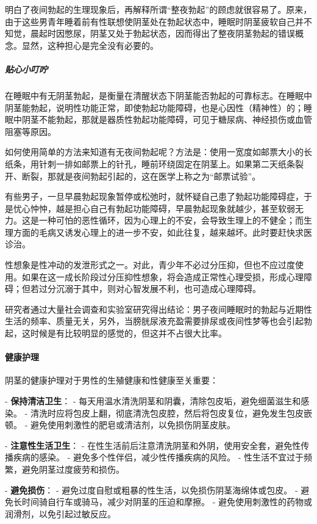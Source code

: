 明白了夜间勃起的生理现象后，再解释所谓“整夜勃起”的顾虑就很容易了。原来，由于这些男青年睡着前有性联想使阴茎处在勃起状态中，睡眠时阴茎疲软自己并不知觉，晨起时因憋尿，阴茎又处于勃起状态，因而得出了整夜阴茎勃起的错误概念。显然，这种担心是完全没有必要的。

\subparagraph{贴心小叮咛}

在睡眠中有无阴茎勃起，是衡量在清醒状态下阴茎能否勃起的可靠标志。在睡眠中阴茎能勃起，说明性功能正常，即使勃起功能障碍，也是心因性（精神性）的；睡眠中阴茎不能勃起，那就是器质性勃起功能障碍，可见于糖尿病、神经损伤或血管阻塞等原因。

如何使用简单的方法来知道有无夜间勃起呢？方法是：使用一宽度如邮票大小的长纸条，用针刺一排如邮票上的针孔，睡前环绕固定在阴茎上。如果第二天纸条裂开、断裂，那就是夜间勃起引起的，这在医学上称之为“邮票试验”。

有些男子，一旦早晨勃起现象暂停或松弛时，就怀疑自己患了勃起功能障碍症，于是忧心忡忡，越是担心自己有勃起功能障碍，早晨勃起现象就越少，甚至软弱无力。这是一种可怕的恶性循环，因为心理上的不安，会导致生理上的不健全；而生理方面的毛病又诱发心理上的进一步不安，如此往复，越来越坏。此时要赶快求医诊治。

性想象是性冲动的发泄形式之一。对此，青少年不必过分压抑，但也不应过度使用。如果在这一成长阶段过分压抑性想象，将会造成正常性心理受损，形成心理障碍；但若过分沉溺于其中，则对心智发展不利，也可造成心理障碍。

研究者通过大量社会调查和实验室研究得出结论：男子夜间睡眠时的勃起与近期性生活的频率、质量无关，另外，当膀胱尿液充盈需要排尿或夜间性梦等也会引起勃起，这时候是有比较明显的感觉的，但这并不占很大比率。

\paragraph{健康护理}

阴茎的健康护理对于男性的生殖健康和性健康至关重要：

- \textbf{保持清洁卫生}：
  - 每天用温水清洗阴茎和阴囊，清除包皮垢，避免细菌滋生和感染。
  - 清洗时应将包皮上翻，彻底清洗包皮腔，然后将包皮复位，避免发生包皮嵌顿。
  - 避免使用刺激性的肥皂或清洁剂，以免损伤阴茎皮肤。

- \textbf{注意性生活卫生}：
  - 在性生活前后注意清洗阴茎和外阴，使用安全套，避免性传播疾病的感染。
  - 避免多个性伴侣，减少性传播疾病的风险。
  - 性生活不宜过于频繁，避免阴茎过度疲劳和损伤。

- \textbf{避免损伤}：
  - 避免过度自慰或粗暴的性生活，以免损伤阴茎海绵体或包皮。
  - 避免长时间骑自行车或骑马，减少对阴茎的压迫和摩擦。
  - 避免使用刺激性的药物或润滑剂，以免引起过敏反应。

